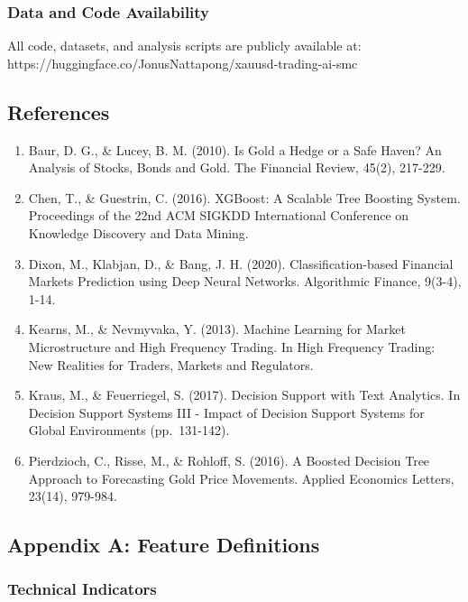 \subsubsection{Data and Code
Availability}\label{data-and-code-availability}

All code, datasets, and analysis scripts are publicly available at:
https://huggingface.co/JonusNattapong/xauusd-trading-ai-smc

\subsection{References}\label{references}

\begin{enumerate}
\def\labelenumi{\arabic{enumi}.}
\item
  Baur, D. G., \& Lucey, B. M. (2010). Is Gold a Hedge or a Safe Haven?
  An Analysis of Stocks, Bonds and Gold. The Financial Review, 45(2),
  217-229.
\item
  Chen, T., \& Guestrin, C. (2016). XGBoost: A Scalable Tree Boosting
  System. Proceedings of the 22nd ACM SIGKDD International Conference on
  Knowledge Discovery and Data Mining.
\item
  Dixon, M., Klabjan, D., \& Bang, J. H. (2020). Classification-based
  Financial Markets Prediction using Deep Neural Networks. Algorithmic
  Finance, 9(3-4), 1-14.
\item
  Kearns, M., \& Nevmyvaka, Y. (2013). Machine Learning for Market
  Microstructure and High Frequency Trading. In High Frequency Trading:
  New Realities for Traders, Markets and Regulators.
\item
  Kraus, M., \& Feuerriegel, S. (2017). Decision Support with Text
  Analytics. In Decision Support Systems III - Impact of Decision
  Support Systems for Global Environments (pp.~131-142).
\item
  Pierdzioch, C., Risse, M., \& Rohloff, S. (2016). A Boosted Decision
  Tree Approach to Forecasting Gold Price Movements. Applied Economics
  Letters, 23(14), 979-984.
\end{enumerate}

\subsection{Appendix A: Feature
Definitions}\label{appendix-a-feature-definitions}

\subsubsection{Technical Indicators}\label{technical-indicators-1}

